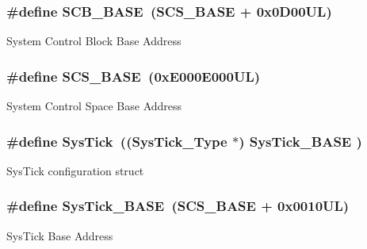 \subsubsection[{S\+C\+B\+\_\+\+B\+A\+S\+E}]{\setlength{\rightskip}{0pt plus 5cm}\#define S\+C\+B\+\_\+\+B\+A\+S\+E~({\bf S\+C\+S\+\_\+\+B\+A\+S\+E} +  0x0\+D00\+U\+L)}\label{group___c_m_s_i_s__core__base_gad55a7ddb8d4b2398b0c1cfec76c0d9fd}
System Control Block Base Address \hypertarget{group___c_m_s_i_s__core__base_ga3c14ed93192c8d9143322bbf77ebf770}{}
\subsubsection[{S\+C\+S\+\_\+\+B\+A\+S\+E}]{\setlength{\rightskip}{0pt plus 5cm}\#define S\+C\+S\+\_\+\+B\+A\+S\+E~(0x\+E000\+E000\+U\+L)}\label{group___c_m_s_i_s__core__base_ga3c14ed93192c8d9143322bbf77ebf770}
System Control Space Base Address \hypertarget{group___c_m_s_i_s__core__base_gacd96c53beeaff8f603fcda425eb295de}{}
\subsubsection[{Sys\+Tick}]{\setlength{\rightskip}{0pt plus 5cm}\#define Sys\+Tick~(({\bf Sys\+Tick\+\_\+\+Type}   $\ast$)     {\bf Sys\+Tick\+\_\+\+B\+A\+S\+E}  )}\label{group___c_m_s_i_s__core__base_gacd96c53beeaff8f603fcda425eb295de}
Sys\+Tick configuration struct \hypertarget{group___c_m_s_i_s__core__base_ga58effaac0b93006b756d33209e814646}{}
\subsubsection[{Sys\+Tick\+\_\+\+B\+A\+S\+E}]{\setlength{\rightskip}{0pt plus 5cm}\#define Sys\+Tick\+\_\+\+B\+A\+S\+E~({\bf S\+C\+S\+\_\+\+B\+A\+S\+E} +  0x0010\+U\+L)}\label{group___c_m_s_i_s__core__base_ga58effaac0b93006b756d33209e814646}
Sys\+Tick Base Address 
